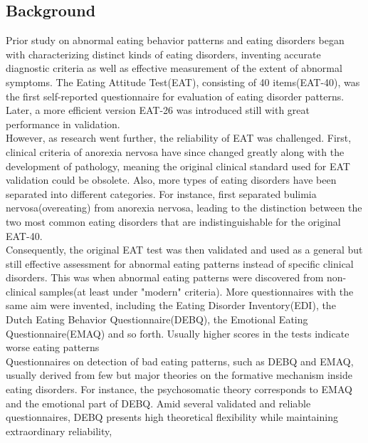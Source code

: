 \documentclass[letterpaper]{article}
\begin{document}
\subsection{Background}
Prior study on abnormal eating behavior patterns and eating disorders began with
characterizing distinct kinds of eating disorders, inventing accurate diagnostic
criteria as well as effective measurement of the extent of abnormal symptoms. The Eating Attitude Test(EAT), 
consisting of 40 items(EAT-40), was the first self-reported questionnaire for evaluation of
eating disorder patterns\cite{garner1979eating}. Later, a more efficient version EAT-26 was introduced
still with great performance in validation\cite{garner1982eating}. \\
\indent However, as research went further, the reliability of EAT was challenged. 
First, clinical criteria of anorexia nervosa have since changed greatly along with the development of pathology,
meaning the original clinical standard\cite{feighner1972diagnostic} used for EAT validation could be obsolete.
Also, more types of eating disorders have been separated into different categories. For instance, \cite{russell1979bulimia} first separated 
bulimia nervosa(overeating) from anorexia nervosa, leading to the distinction between the two most common eating disorders that are indistinguishable for 
the original EAT-40. \\
\indent Consequently, the original EAT test was then validated and used as a general but still effective assessment for abnormal 
eating patterns instead of specific clinical disorders\cite{carter1984screening,gross1986validity}. This was when abnormal eating patterns 
were discovered from non-clinical samples(at least under "modern" criteria). More questionnaires with the same aim
were invented, including the Eating Disorder Inventory(EDI)\cite{garner1983development}, the Dutch Eating Behavior Questionnaire(DEBQ)\cite{van1986dutch}, 
the Emotional Eating Questionnaire(EMAQ)\cite{geliebter2003emotional} and so forth. Usually higher scores in the tests indicate worse eating patterns\\
\indent Questionnaires on detection of bad eating patterns, such as DEBQ and EMAQ, usually derived from few but major theories on the formative
mechanism inside eating disorders. For instance, the psychosomatic theory\cite{bruch1964psychological} corresponds to EMAQ and the emotional part of DEBQ.
Amid several validated and reliable questionnaires, DEBQ presents high theoretical flexibility while 
maintaining extraordinary reliability\cite{hyland1989psychometric,braet1997assessment,nolan2010emotional},
\end{document}

